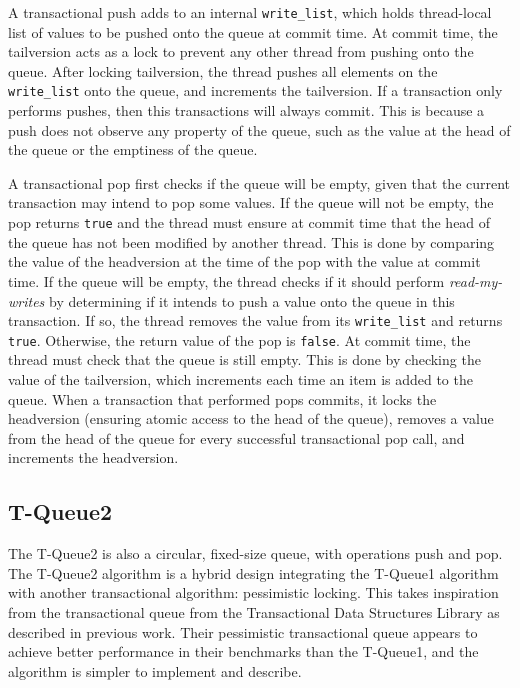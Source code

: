 A transactional push adds to an internal \texttt{write\_list}, which holds thread-local list of values to be pushed onto the queue at commit time. At commit time, the tailversion acts as a lock to prevent any other thread from pushing onto the queue. After locking tailversion, the thread pushes all elements on the \texttt{write\_list} onto the queue, and increments the tailversion.
If a transaction only performs pushes, then this transactions will always commit. This is because a push does not observe any property of the queue, such as the value at the head of the queue or the emptiness of the queue. 

A transactional pop first checks if the queue will be empty, given that the current transaction may intend to pop some values. If the queue will not be empty, the pop returns \texttt{true} and the thread must ensure at commit time that the head of the queue has not been modified by another thread. This is done by comparing the value of the headversion at the time of the pop with the value at commit time. 
If the queue will be empty, the thread checks if it should perform \emph{read-my-writes} by determining if it intends to push a value onto the queue in this transaction. If so, the thread removes the value from its \texttt{write\_list} and returns \texttt{true}. Otherwise, the return value of the pop is \texttt{false}. At commit time, the thread must check that the queue is still empty. This is done by checking the value of the tailversion, which increments each time an item is added to the queue.
When a transaction that performed pops commits, it locks the headversion (ensuring atomic access to the head of the queue), removes a value from the head of the queue for every successful transactional pop call, and increments the headversion.


\subsection{T-Queue2}
The T-Queue2 is also a circular, fixed-size queue, with operations push and pop. The T-Queue2 algorithm is a hybrid design integrating the T-Queue1 algorithm with another transactional algorithm: pessimistic locking. This takes inspiration from the transactional queue from the Transactional Data Structures Library\cite{tdsl} as described in previous work. Their pessimistic transactional queue appears to achieve better performance in their benchmarks than the T-Queue1, and the algorithm is simpler to implement and describe. 

